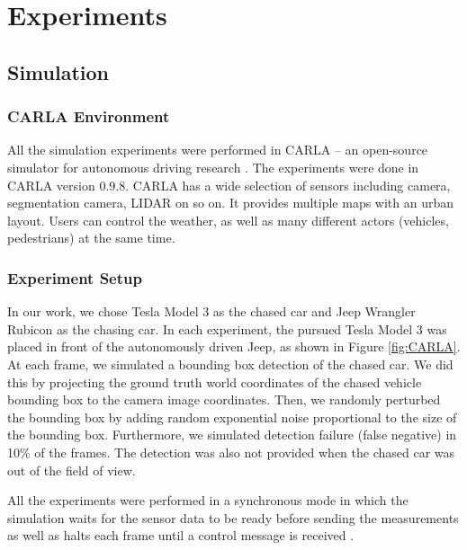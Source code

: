 \documentclass{ctuthesis/ctuthesis}
\begin{document}
\chapter{Experiments}\label{s:experiments}
\section{Simulation}
\subsection{CARLA Environment}
All the simulation experiments were performed in CARLA -- an open-source simulator for autonomous driving research \cite{CARLA}. The experiments were done in CARLA version 0.9.8. CARLA has a wide selection of sensors including camera, segmentation camera, LIDAR on so on. It provides multiple maps with an urban layout. Users can control the weather, as well as many different actors (vehicles, pedestrians) at the same time. \par




\subsection{Experiment Setup}
In our work, we chose Tesla Model 3 as the chased car and Jeep Wrangler Rubicon as the chasing car. In each experiment, the pursued Tesla Model 3 was placed in front of the autonomously driven Jeep, as shown in Figure \ref{fig:CARLA}. At each frame, we simulated a bounding box detection of the chased car. We did this by projecting the ground truth world coordinates of the chased vehicle bounding box to the camera image coordinates. Then, we randomly perturbed the bounding box by adding random exponential noise proportional to the size of the bounding box. Furthermore, we simulated detection failure (false negative) in 10\% of the frames. The detection was also not provided when the chased car was out of the field of view.\par

All the experiments were performed in a synchronous mode in which the simulation waits for the sensor data to be ready before sending the measurements as well as halts each frame until a control message is received \cite{CARLA}. \par
\end{document}
